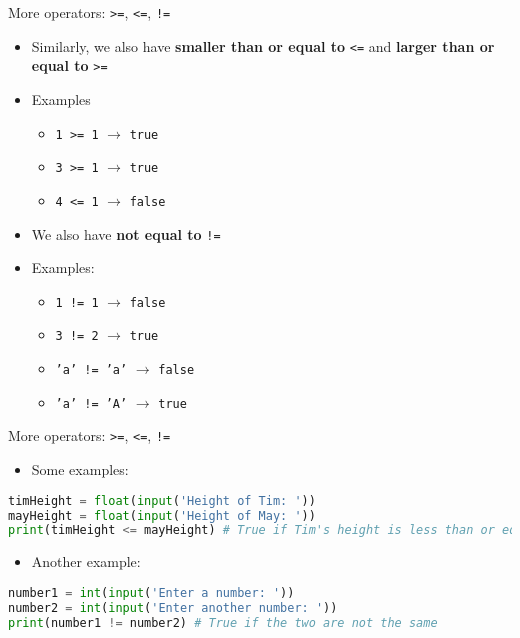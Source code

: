 \documentclass[10pt,xcolor={table,dvipsnames},t]{beamer}
\begin{document}
\begin{frame}{More operators: \texttt{>=}, \texttt{<=}, \texttt{!=}}
  \begin{itemize}
    \item Similarly, we also have \textbf{smaller than or equal to} \texttt{<=} and \textbf{larger than or equal to} \texttt{>=}
    \item Examples
    \begin{itemize}
      \item \texttt{1 >= 1} $\rightarrow$ \texttt{true}
      \item \texttt{3 >= 1} $\rightarrow$ \texttt{true}
      \item \texttt{4 <= 1} $\rightarrow$ \texttt{false}
    \end{itemize}
    \item We also have \textbf{not equal to} \texttt{!=}
    \item  Examples:
    \begin{itemize}
      \item  \texttt{1 != 1} $\rightarrow$ \texttt{false}
      \item  \texttt{3 != 2} $\rightarrow$ \texttt{true}
      \item  \texttt{'a' != 'a'} $\rightarrow$ \texttt{false}
      \item  \texttt{'a' != 'A'} $\rightarrow$ \texttt{true}
    \end{itemize}
  \end{itemize}
\end{frame}
\begin{frame}[fragile]{More operators: \texttt{>=}, \texttt{<=}, \texttt{!=}}
\begin{itemize}
  \item Some examples:
\end{itemize}
\begin{lstlisting}[language=python]
timHeight = float(input('Height of Tim: '))
mayHeight = float(input('Height of May: '))
print(timHeight <= mayHeight) # True if Tim's height is less than or equal to May's
\end{lstlisting}
\begin{itemize}
  \item Another example:
\end{itemize}
\begin{lstlisting}[language=python]
number1 = int(input('Enter a number: '))
number2 = int(input('Enter another number: '))
print(number1 != number2) # True if the two are not the same  
\end{lstlisting}
\end{frame}
\end{document}

